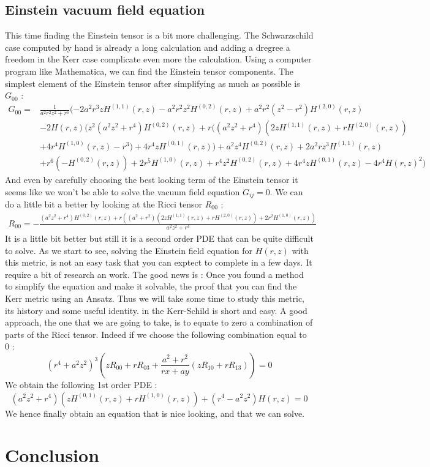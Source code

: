 \documentclass[a4paper,12pt]{article}
\theoremstyle{definition}
\begin{document}
\subsection{Einstein vacuum field equation}
This time finding the Einstein tensor is a bit more challenging.
The Schwarzschild case computed by hand is already a long calculation and adding a dregree a freedom in the Kerr case complicate even more the calculation.
Using a computer program like Mathematica, we can find the Einstein tensor components.
The simplest element of the Einstein tensor after simplifying as much as possible is $G_{00}$ :
\begin{align*}
	G_{00} = &\frac{1}{a^2 r^2z^2+r^6}(-2 a^2 r^3 z H^{(1,1)}(r,z)-a^2 r^2 z^2 H^{(0,2)}(r,z)+a^2 r^2(z^2-r^2) H^{(2,0)}(r,z)\\
	&-2 H(r,z) (z^2 (a^2z^2+r^4) H^{(0,2)}(r,z)+r ((a^2 z^2+r^4)(2 z H^{(1,1)}(r,z)+r H^{(2,0)}(r,z))\\
	&+4r^4H^{(1,0)}(r,z)-r^3)+4 r^4 z H^{(0,1)}(r,z))+a^2 z^4H^{(0,2)}(r,z)+2 a^2 r z^3 H^{(1,1)}(r,z)\\
	&+r^6(-H^{(0,2)}(r,z))+2 r^5 H^{(1,0)}(r,z)+r^4 z^2H^{(0,2)}(r,z)+4 r^4 z H^{(0,1)}(r,z)-4 r^4 H(r,z)^2)
\end{align*}
And even by carefully choosing the best looking term of the Einstein tensor it seems like we won't be able to solve the vacuum field equation $G_{ij}=0$.
We can do a little bit a better by looking at the Ricci tensor $R_{00}$ :
\begin{align*}
	R_{00}=-\frac{(a^2 z^2+r^4) H^{(0,2)}(r,z)+r
	((a^2+r^2) (2 z H^{(1,1)}(r,z)+r
	H^{(2,0)}(r,z))+2 r^2 H^{(1,0)}(r,z))}{a^2 z^2+r^4}
\end{align*}
It is a little bit better but still it is a second order PDE that can be quite difficult to solve.
As we start to see, solving the Einstein field equation for $H(r,z)$ with this metric, is not an easy task that you can exptect to complete in a few days.
It require a bit of research an work.
The good news is : Once you found a method to simplify the equation and make it solvable, the proof that you can find the Kerr metric using an Ansatz.
Thus we will take some time to study this metric, its history and some useful identity. in the Kerr-Schild is short and easy.
A good approach, the one that we are going to take, is to equate to zero a combination of parts of the Ricci tensor.
Indeed if we choose the following combination equal to $0$ :
\begin{equation*}
	(r^4+a^2z^2)^3(zR_{00}+rR_{03}+\frac{a^2+r^2}{rx+ay}(zR_{10}+rR_{13}))=0
\end{equation*}
We obtain the following 1st order PDE :
\begin{equation}
	(a^2 z^2+r^4) (z H^{(0,1)}(r,z)+rH^{(1,0)}(r,z))+(r^4-a^2 z^2) H(r,z)=0
\end{equation}
We hence finally obtain an equation that is nice looking, and that we can solve.

\section{Conclusion}
\end{document}
